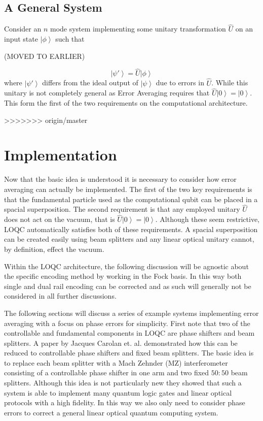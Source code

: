 \documentclass[aps,pra,twocolumn,superscriptaddress,numerical]{revtex4-1}
\begin{document}
\subsection{A General System \label{gen system}} 
Consider an $n$ mode system implementing some unitary transformation $\hat{U}$ on an input state $\left|\phi\right>$ such that

(MOVED TO EARLIER)

\begin{equation}
	\left|\psi'\right> = \hat{U} \left|\phi\right>
\end{equation}
where $\left|\psi'\right>$ differs from the ideal output of $\left|\psi\right>$ due to errors in $\hat{U}$. While this unitary is not completely general as Error Averaging requires that $\hat{U}\left|0\right>=\left|0\right>$. This form the first of the two requirements on the computational architecture.

>>>>>>> origin/master
\section{Implementation \label{implementation}}
		
	Now that the basic idea is understood it is necessary to consider how error averaging can actually be implemented. The first of the two key requirements is that the fundamental particle used as the computational qubit can be placed in a spacial superposition. The second requirement is that any employed unitary $\hat{U}$  does not act on the vacuum, that is $\hat{U}\left|0\right>=\left|0\right>$. Although these seem restrictive, LOQC automatically satisfies both of these requirements. A spacial superposition can be created easily using beam splitters and any linear optical unitary cannot, by definition, effect the vacuum.
	
	Within the LOQC architecture, the following discussion will be agnostic about the specific encoding method by working in the Fock basis. In this way both single and dual rail encoding can be corrected and as such will generally not be considered in all further discussions.
	
	The following sections will discuss a series of example systems implementing error averaging with a focus on phase errors for simplicity. First note that two of the controllable and fundamental components in LOQC are phase shifters and beam splitters. A paper by Jacques Carolan et. al. \cite{ULO} demonstrated how this can be reduced to controllable phase shifters and fixed beam splitters. The basic idea is to replace each beam splitter with a Mach Zehnder (MZ) interferometer consisting of a controllable phase shifter in one arm and two fixed $50:50$ beam splitters. Although this idea is not particularly new they showed that such a system is able to implement many quantum logic gates and linear optical protocols with a high fidelity.  In this way we also only need to consider phase errors to correct a general linear optical quantum computing system.
	
\end{document}
